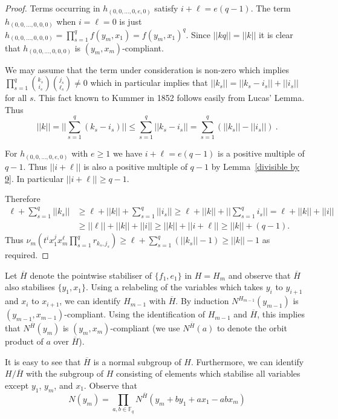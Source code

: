 \documentclass{amsart}
\newcommand{\field}{\mathbb{F}}
\newcommand{\binomial}[2]{\genfrac{(}{)}{0pt}{}{#1}{#2}}
\begin{document}
\begin{proof}
Terms occurring in $h_{(0,0,\dots,0,e,0)}$ satisfy $i+\ell=e(q-1)$.  The term $h_{(0,0,\dots,0,0,0)}$   
   when $i=\ell=0$ is just $h_{(0,0,\dots,0,0,0)}=\prod_{s=1}^q  f(y_m, x_1) = f(y_m,x_1)^q$.
     Since $||kq||=||k||$ it is clear that 
     $h_{(0,0,\dots,0,0,0)}$ is $(y_m,x_m)$-compliant.


   We may assume that the term under consideration is non-zero which implies $\prod_{s=1}^q \binomial{k_s}{i_s}\binomial{j_s}{\ell_s}\neq 0$
   which in particular implies that $||k_s|| = ||k_s-i_s|| + ||i_s||$ for all $s$. 
       This fact known
    to Kummer \cite[pp.~115--116]{kummer:1852} in 1852 follows easily from Lucas' Lemma.
Thus $$||k|| = ||\sum_{s=1}^q (k_s-i_s)|| \leq  \sum_{s=1}^q ||k_s-i_s|| = \sum_{s=1}^q (||k_s|| - ||i_s||)\ .$$

For $h_{(0,0,\dots,0,e,0)}$ with $e\geq 1$ we have $i+\ell=e(q-1)$ is a positive multiple of $q-1$.
Thus $||i+\ell||$ is also a positive multiple of $q-1$ by Lemma~\ref{divisible by 9}. 
 In particular $||i+\ell|| \geq q-1$.


   
   Therefore
   \begin{align*}
   \ell+\sum_{s=1}^q ||k_s|| &\geq \ell+ ||k|| + \sum_{s=1}^q ||i_s||
     \geq \ell + ||k|| + ||\sum_{s=1}^q i_s||
     = \ell + ||k|| +||i|| \\
    &\geq ||\ell|| + ||k|| +|| i ||
    \geq ||k|| + || i+\ell ||
        \geq ||k|| + (q-1).
   \end{align*}
Thus $\nu_m(t^i x_1^j x_m^\ell\prod_{s=1}^q r_{k_s,j_s}) \geq \ell+\sum_{s=1}^q (||k_s||-1) \geq ||k||-1$ as required.
\end{proof}


Let $\overline{H}$ denote the pointwise stabiliser of $\{f_1,e_1\}$ in $H=H_m$ and observe that $\overline{H}$ also stabilises $\{y_1,x_1\}$.
 Using a relabeling of the variables which takes $y_i$ to $y_{i+1}$and $x_i$ to $x_{i+1}$, we can identify $H_{m-1}$ with
$\overline{H}$.
By induction $N^{H_{m-1}}(y_{m-1})$ is $(y_{m-1},x_{m-1})$-compliant.
Using the identification of $H_{m-1}$ and $\overline{H}$, this 
implies that $N^{\overline{H}}(y_m)$ is $(y_m,x_m)$-compliant
(we use $N^{\overline{H}}(a)$ to denote the orbit product of $a$ over $\overline{H}$).

It is easy to see that $\overline{H}$ is a normal subgroup of $H$.
Furthermore, we can identify  $H/\overline{H}$ with the subgroup of $H$ consisting of elements which stabilise all variables except $y_1$, $y_m$, and $x_1$.
Observe that $$N(y_m)=\prod_{a,b\in\field_q}N^{\overline{H}}(y_m+by_1+ax_1-abx_m)$$
\end{document}
